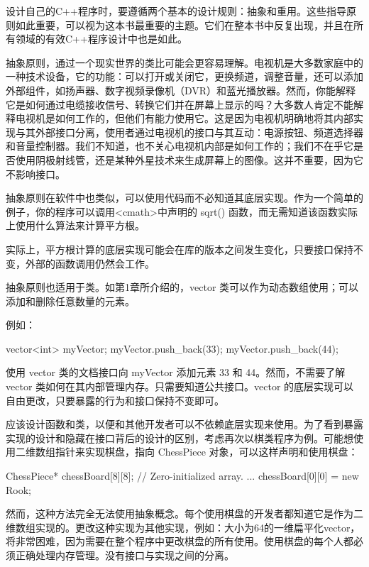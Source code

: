 
设计自己的C++程序时，要遵循两个基本的设计规则：抽象和重用。这些指导原则如此重要，可以视为这本书最重要的主题。它们在整本书中反复出现，并且在所有领域的有效C++程序设计中也是如此。


抽象原则，通过一个现实世界的类比可能会更容易理解。电视机是大多数家庭中的一种技术设备，它的功能：可以打开或关闭它，更换频道，调整音量，还可以添加外部组件，如扬声器、数字视频录像机（DVR）和蓝光播放器。然而，你能解释它是如何通过电缆接收信号、转换它们并在屏幕上显示的吗？大多数人肯定不能解释电视机是如何工作的，但他们有能力使用它。这是因为电视机明确地将其内部实现与其外部接口分离，使用者通过电视机的接口与其互动：电源按钮、频道选择器和音量控制器。我们不知道，也不关心电视机内部是如何工作的；我们不在乎它是否使用阴极射线管，还是某种外星技术来生成屏幕上的图像。这并不重要，因为它不影响接口。


抽象原则在软件中也类似，可以使用代码而不必知道其底层实现。作为一个简单的例子，你的程序可以调用<cmath>中声明的 sqrt() 函数，而无需知道该函数实际上使用什么算法来计算平方根。

实际上，平方根计算的底层实现可能会在库的版本之间发生变化，只要接口保持不变，外部的函数调用仍然会工作。

抽象原则也适用于类。如第1章所介绍的，vector 类可以作为动态数组使用；可以添加和删除任意数量的元素。

例如：

\begin{cpp}
vector<int> myVector;
myVector.push_back(33);
myVector.push_back(44);
\end{cpp}

使用 vector 类的文档接口向 myVector 添加元素 33 和 44。然而，不需要了解 vector 类如何在其内部管理内存。只需要知道公共接口。vector 的底层实现可以自由更改，只要暴露的行为和接口保持不变即可。


应该设计函数和类，以便和其他开发者可以不依赖底层实现来使用。为了看到暴露实现的设计和隐藏在接口背后的设计的区别，考虑再次以棋类程序为例。可能想使用二维数组指针来实现棋盘，指向 ChessPiece 对象，可以这样声明和使用棋盘：

\begin{cpp}
ChessPiece* chessBoard[8][8]{}; // Zero-initialized array.
...
chessBoard[0][0] = new Rook{};
\end{cpp}

然而，这种方法完全无法使用抽象概念。每个使用棋盘的开发者都知道它是作为二维数组实现的。更改这种实现为其他实现，例如：大小为64的一维扁平化vector，将非常困难，因为需要在整个程序中更改棋盘的所有使用。使用棋盘的每个人都必须正确处理内存管理。没有接口与实现之间的分离。

